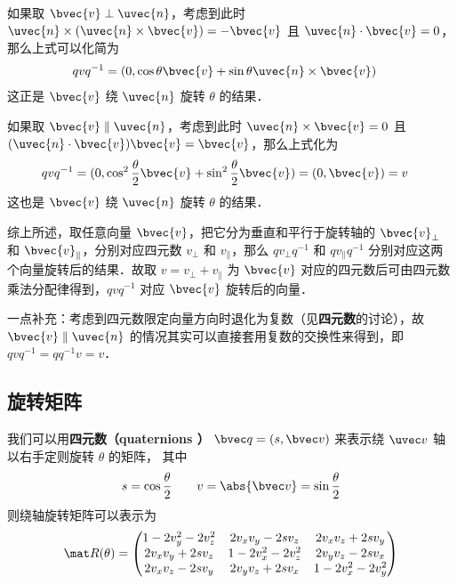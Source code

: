 如果取 $\bvec{v}\perp{\uvec{n}}$，考虑到此时 ${\uvec{n}}\times({\uvec{n}}\times\bvec{v})=-\bvec{v}$ 且 ${\uvec{n}}\cdot\bvec{v}=0$，那么上式可以化简为
\begin{equation}
\begin{aligned}
qvq^{-1}&=(0, \cos\theta\bvec{v}+\sin\theta{\uvec{n}}\times\bvec{v})
\end{aligned}
\end{equation}
这正是 $\bvec{v}$ 绕 ${\uvec{n}}$ 旋转 $\theta$ 的结果．

如果取 $\bvec{v}\parallel{\uvec{n}}$，考虑到此时 ${\uvec{n}}\times\bvec{v}=0$ 且 $({\uvec{n}}\cdot\bvec{v})\bvec{v}=\bvec{v}$，那么上式化为
\begin{equation}
\begin{aligned}
qvq^{-1}&=(0, \cos^2\frac{\theta}{2}\bvec{v}+\sin^2\frac{\theta}{2}\bvec{v})=(0, \bvec{v})=v
\end{aligned}
\end{equation}
这也是 $\bvec{v}$ 绕 ${\uvec{n}}$ 旋转 $\theta$ 的结果．

综上所述，取任意向量 $\bvec{v}$，把它分为垂直和平行于旋转轴的 $\bvec{v}_\perp$ 和 $\bvec{v}_\parallel$，分别对应四元数 $v_\perp$ 和 $v_\parallel$，那么 $q v_\perp q^{-1}$ 和 $q v_\parallel q^{-1}$ 分别对应这两个向量旋转后的结果．故取 $v=v_\perp+v_\parallel$ 为 $\bvec{v}$ 对应的四元数后可由四元数乘法分配律得到，$qvq^{-1}$ 对应 $\bvec{v}$ 旋转后的向量．

一点补充：考虑到四元数限定向量方向时退化为复数（见\textbf{四元数}的讨论），故 $\bvec{v}\parallel{\uvec{n}}$ 的情况其实可以直接套用复数的交换性来得到，即 $qvq^{-1}=qq^{-1}v=v$．


\subsection{旋转矩阵}
我们可以用\textbf{四元数（quaternions ）} $\bvec q = (s, \bvec v)$ 来表示绕 $\uvec v$ 轴以右手定则旋转 $\theta$ 的矩阵， 其中
\begin{equation}
s = \cos\frac{\theta}{2} \qquad
v = \abs{\bvec v} = \sin\frac{\theta}{2}
\end{equation}
则绕轴旋转矩阵可以表示为
\begin{equation}\label{QuatN_eq2}
\mat R(\theta) =
\begin{pmatrix}
1 - 2v_y^2 - 2v_z^2 & 2v_xv_y - 2sv_z  & 2v_x v_z + 2s v_y\\
2v_x v_y + 2sv_z & 1 - 2v_x^2 - 2v_z^2 & 2v_y v_z - 2s v_x\\
2v_x v_z - 2s v_y & 2v_y v_z + 2s v_x & 1 - 2v_x^2 - 2v_y^2
\end{pmatrix}
\end{equation}

